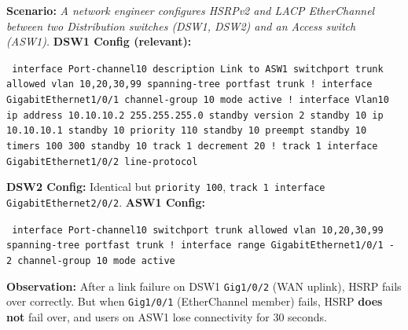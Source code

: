 \documentclass[11pt]{article}
\begin{document}
\begin{exoresolu}
\textbf{Scenario:} \textit{A network engineer configures HSRPv2 and LACP EtherChannel between two Distribution switches (DSW1, DSW2) and an Access switch (ASW1).}
\textbf{DSW1 Config (relevant):}
\begin{flushleft}
\texttt{
interface Port-channel10\newline
 description Link to ASW1\newline
 switchport trunk allowed vlan 10,20,30,99\newline
 spanning-tree portfast trunk\newline
!\newline
interface GigabitEthernet1/0/1\newline
 channel-group 10 mode active\newline
!\newline
interface Vlan10\newline
 ip address 10.10.10.2 255.255.255.0\newline
 standby version 2\newline
 standby 10 ip 10.10.10.1\newline
 standby 10 priority 110\newline
 standby 10 preempt\newline
 standby 10 timers 100 300\newline
 standby 10 track 1 decrement 20\newline
!\newline
track 1 interface GigabitEthernet1/0/2 line-protocol
}
\end{flushleft}
\textbf{DSW2 Config:} Identical but \texttt{priority 100}, \texttt{track 1 interface GigabitEthernet2/0/2}.
\textbf{ASW1 Config:}
\begin{flushleft}
\texttt{
interface Port-channel10\newline
 switchport trunk allowed vlan 10,20,30,99\newline
 spanning-tree portfast trunk\newline
!\newline
interface range GigabitEthernet1/0/1 - 2\newline
 channel-group 10 mode active
}
\end{flushleft}
\textbf{Observation:} After a link failure on DSW1 \texttt{Gig1/0/2} (WAN uplink), HSRP fails over correctly. But when \texttt{Gig1/0/1} (EtherChannel member) fails, HSRP \textbf{does not} fail over, and users on ASW1 lose connectivity for $30$ seconds.


\end{exoresolu}
\end{document}
